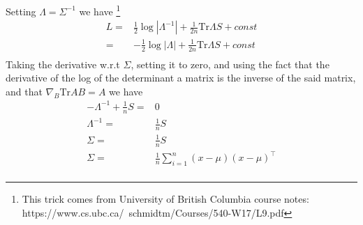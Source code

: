 \documentclass[12pt]{article}
\newcommand{\tr}{\mathrm{Tr}}
\begin{document}
Setting $\Lambda=\Sigma^{-1}$ we have \footnote{This trick comes from University of British Columbia course notes: https://www.cs.ubc.ca/~schmidtm/Courses/540-W17/L9.pdf}
\begin{equation}
\begin{split}
    L 
=& \frac{1}{2}\log|\Lambda^{-1}| + \frac{1}{2n}\tr\Lambda S + const\\
=& -\frac{1}{2}\log|\Lambda| + \frac{1}{2n}\tr\Lambda S + const\\
\end{split}
\label{eq:loglike6}
\end{equation}
Taking the derivative w.r.t $\Sigma$, setting it to zero, and using the fact that the derivative of the log of the determinant a matrix is the inverse of the said matrix, and that $\nabla_B \tr AB=A$ we have
\begin{equation}
\begin{split}
 -\Lambda^{-1} + \frac{1}{n}S=&0\\
 \Lambda^{-1} =& \frac{1}{n}S\\
\Sigma =& \frac{1}{n}S\\
\Sigma =& \frac{1}{n}\sum_{i=1}^n(x-\mu)(x-\mu)^\top\\
\end{split}
\label{eq:loglike7}
\end{equation}
\end{document}
